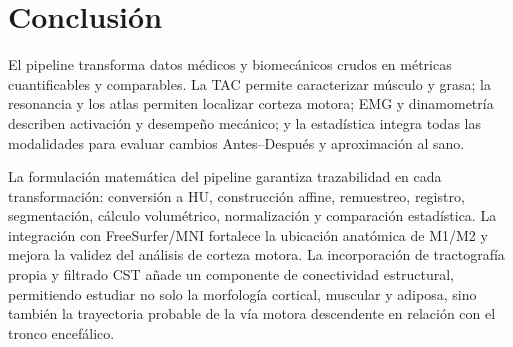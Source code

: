 \documentclass[12pt,a4paper]{article}
\begin{document}
\section{Conclusión}

El pipeline transforma datos médicos y biomecánicos crudos en métricas cuantificables y comparables. La TAC permite caracterizar músculo y grasa; la resonancia y los atlas permiten localizar corteza motora; EMG y dinamometría describen activación y desempeño mecánico; y la estadística integra todas las modalidades para evaluar cambios Antes--Después y aproximación al sano.

La formulación matemática del pipeline garantiza trazabilidad en cada transformación: conversión a HU, construcción affine, remuestreo, registro, segmentación, cálculo volumétrico, normalización y comparación estadística. La integración con FreeSurfer/MNI fortalece la ubicación anatómica de M1/M2 y mejora la validez del análisis de corteza motora. La incorporación de tractografía propia y filtrado CST añade un componente de conectividad estructural, permitiendo estudiar no solo la morfología cortical, muscular y adiposa, sino también la trayectoria probable de la vía motora descendente en relación con el tronco encefálico.
\end{document}

